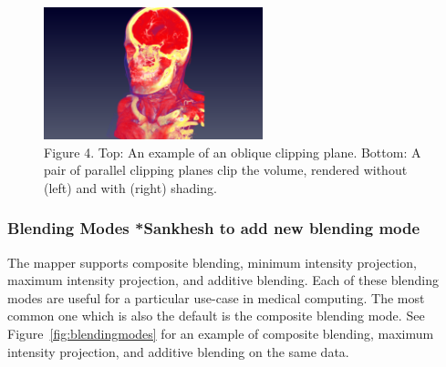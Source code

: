 \begin{figure}
\centering
\includegraphics[width=2.5in]{HeadClippingOblique.png}
\caption{Figure 4. Top: An example of an oblique clipping plane. Bottom: A pair of parallel clipping planes clip the volume, rendered without (left) and with (right) shading.}
\label{fig:clipping}
\end{figure}

\subsubsection{Blending Modes *Sankhesh to add new blending mode}
The mapper supports composite blending, minimum intensity projection, maximum intensity projection, and additive blending. Each of these blending modes are useful for a particular use-case in medical computing. The most common one which is also the default is the composite blending mode. See Figure~\ref{fig:blendingmodes} for an example of composite blending, maximum intensity projection, and additive blending on the same data.

